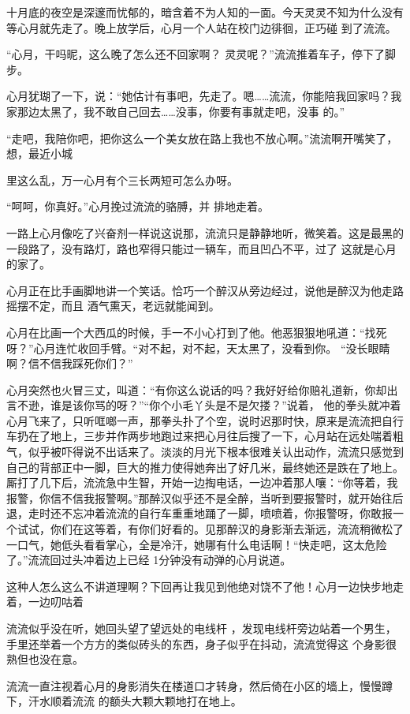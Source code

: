 \documentclass{article}
\begin{document}
十月底的夜空是深邃而忧郁的，暗含着不为人知的一面。今天灵灵不知为什么没有等心月就先走了。晚上放学后，心月一个人站在校门边徘徊，正巧碰
到了流流。 

“心月，干吗昵，这么晚了怎么还不回家啊？
灵灵呢？”流流推着车子，停下了脚步。 

心月犹瑚了一下，说：“她估计有事吧，先走了。嗯……流流，你能陪我回家吗？我家那边太黑了，我不敢自己回去……没事，你要有事就走吧，没事
的。” 

“走吧，我陪你吧，把你这么一个美女放在路上我也不放心啊。”流流啊开嘴笑了，想，最近小城

\newpage
里这么乱，万一心月有个三长两短可怎么办呀。 

“呵呵，你真好。”心月挽过流流的骆膊，并
排地走着。 

一路上心月像吃了兴奋剂一样说这说那，流流只是静静地听，微笑着。这是最黑的一段路了，没有路灯，路也窄得只能过一辆车，而且凹凸不平，过了
这就是心月的家了。 

心月正在比手画脚地讲一个笑话。恰巧一个醉汉从旁边经过，说他是醉汉为他走路摇摆不定，而且
酒气熏天，老远就能闻到。 

心月在比画一个大西瓜的时候，手一不小心打到了他。他恶狠狠地吼道：“找死呀？”心月连忙收回手臂。“对不起，对不起，天太黑了，没看到你。
“没长眼睛啊？信不信我踩死你们？” 

心月突然也火冒三丈，叫道：“有你这么说话的吗？我好好给你赔礼道新，你却出言不逊，谁是该你骂的呀？”“你个小毛丫头是不是欠搂？”说着，
\newpage
他的拳头就冲着心月飞来了，只听哐啷一声，那拳头扑了个空，说时迟那时快，原来是流流把自行车扔在了地上，三步并作两步地跑过来把心月往后搜了一下，心月站在远处喘着粗气，似乎被吓得说不出话来了。淡淡的月光下根本很难关认出动作，流流只感觉到自己的背部正中一脚，巨大的推力使得她奔出了好几米，最终她还是跌在了地上。厮打了几下后，流流急中生智，开始一边掏电话，一边冲着那人嚷：“你等着，我报警，你信不信我报警啊。”那醉汉似乎还不是全醉，当听到要报警时，就开始往后退，走时还不忘冲着流流的自行车重重地踊了一脚，喷喷着，你报警呀，你敢报一个试试，你们在这等着，有你们好看的。见那醉汉的身影渐去渐远，流流稍微松了一口气，她低头看看掌心，全是冷汗，她哪有什么电话啊！“快走吧，这太危险了。”流流回过头冲着边上已经
1分钟没有动弹的心月说道。 

这种人怎么这么不讲道理啊？下回再让我见到他绝对饶不了他！心月一边快步地走着，一边叨咕着

流流似乎没在听，她回头望了望远处的电线杆
\newpage
，发现电线杆旁边站着一个男生，手里还举着一个方方的类似砖头的东西，身子似乎在抖动，流流觉得这
个身影很熟但也没在意。 

流流一直注视着心月的身影消失在楼道口才转身，然后倚在小区的墙上，慢慢蹲下，汗水顺着流流
的额头大颗大颗地打在地上。 
\end{document}
